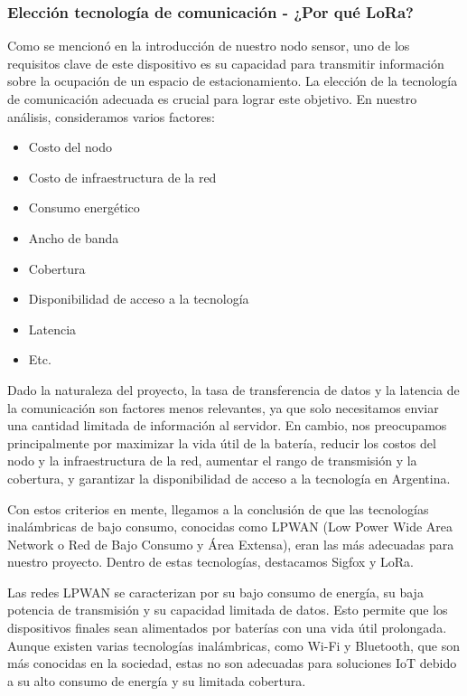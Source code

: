 \subsubsection{Elección tecnología de comunicación - ¿Por qué LoRa?}
Como se mencionó en la introducción de nuestro nodo sensor, uno de los requisitos clave de este dispositivo es su capacidad para transmitir información sobre la ocupación de un espacio de estacionamiento. La elección de la tecnología de comunicación adecuada es crucial para lograr este objetivo. En nuestro análisis, consideramos varios factores:

\begin{itemize}
    \item Costo del nodo
    \item Costo de infraestructura de la red
    \item Consumo energético
    \item Ancho de banda
    \item Cobertura
    \item Disponibilidad de acceso a la tecnología
    \item Latencia
    \item Etc.
\end{itemize}

Dado la naturaleza del proyecto, la tasa de transferencia de datos y la latencia de la comunicación son factores menos relevantes, ya que solo necesitamos enviar una cantidad limitada de información al servidor. En cambio, nos preocupamos principalmente por maximizar la vida útil de la batería, reducir los costos del nodo y la infraestructura de la red, aumentar el rango de transmisión y la cobertura, y garantizar la disponibilidad de acceso a la tecnología en Argentina.

Con estos criterios en mente, llegamos a la conclusión de que las tecnologías inalámbricas de bajo consumo, conocidas como LPWAN (Low Power Wide Area Network o Red de Bajo Consumo y Área Extensa), eran las más adecuadas para nuestro proyecto. Dentro de estas tecnologías, destacamos Sigfox y LoRa.

Las redes LPWAN se caracterizan por su bajo consumo de energía, su baja potencia de transmisión y su capacidad limitada de datos. Esto permite que los dispositivos finales sean alimentados por baterías con una vida útil prolongada. Aunque existen varias tecnologías inalámbricas, como Wi-Fi y Bluetooth, que son más conocidas en la sociedad, estas no son adecuadas para soluciones IoT debido a su alto consumo de energía y su limitada cobertura.

